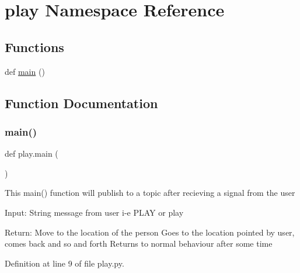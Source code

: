 \hypertarget{namespaceplay}{}\section{play Namespace Reference}
\label{namespaceplay}
\subsection*{Functions}
\begin{DoxyCompactItemize}
\item 
def \hyperlink{namespaceplay_ade14e29273206a003880e2075222c501}{main} ()
\end{DoxyCompactItemize}


\subsection{Function Documentation}
\mbox{\label{namespaceplay_ade14e29273206a003880e2075222c501}} 
\subsubsection{\texorpdfstring{main()}{main()}}
{\footnotesize\ttfamily def play.\+main (\begin{DoxyParamCaption}{ }\end{DoxyParamCaption})}

\begin{DoxyVerb}This main() function will publish to a topic after recieving a signal from the user

Input:
String message from user i-e PLAY or play

Return:
Move to the location of the person
Goes to the location pointed by user, comes back and so and forth
Returns to normal behaviour after some time
\end{DoxyVerb}
 

Definition at line 9 of file play.\+py.

